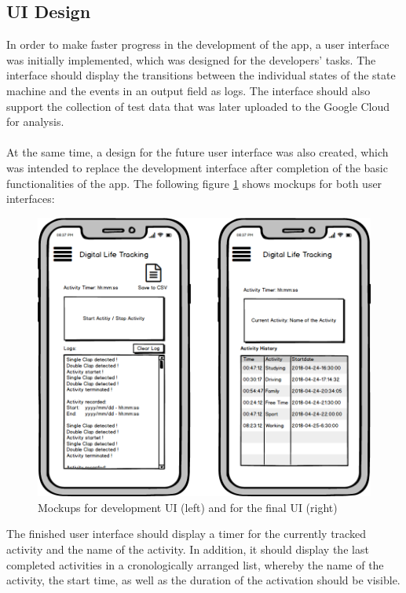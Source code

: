 \subsection{UI Design}
\label{sec:orgc19d2ea}
In order to make faster progress in the development of the app, a user interface was initially implemented, which was designed for the developers' tasks. The interface should display the transitions between the individual states of the state machine and the events in an output field as logs. The interface should also support the collection of test data that was later uploaded to the Google Cloud for analysis. 
\\\\
At the same time, a design for the future user interface was also created, which was intended to replace the development interface after completion of the basic functionalities of the app. The following figure \ref{mockups} shows mockups for both user interfaces:
\begin{figure}[H]
	\centering
	\includegraphics[width=1.0\linewidth]{./imgs/mock.png}
	\caption{Mockups for development UI (left) and for the final UI (right)}
	\label{mockups}
\end{figure}
The finished user interface should display a timer for the currently tracked activity and the name of the activity. In addition, it should display the last completed activities in a cronologically arranged list, whereby the name of the activity, the start time, as well as the duration of the activation should be visible.
\\
